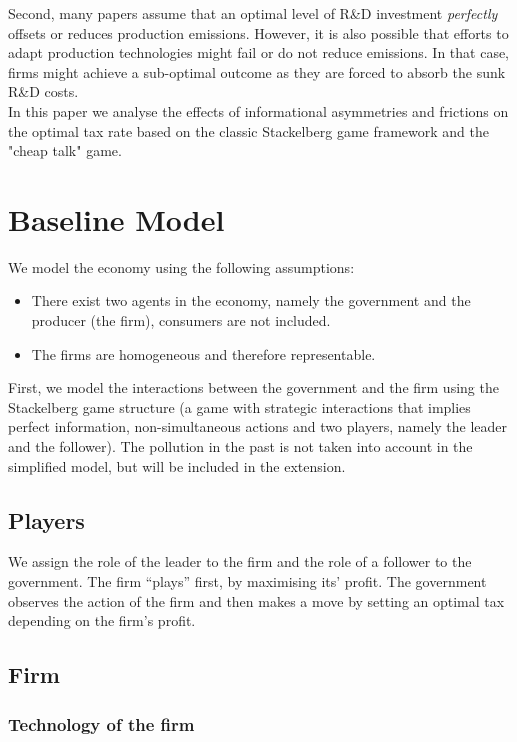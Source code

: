 \documentclass{article}
\begin{document}
Second, many papers assume that an optimal level of R\&D investment \textit{perfectly} offsets or reduces production emissions. However, it is also possible that efforts to adapt production technologies might fail or do not reduce emissions. In that case, firms might achieve a sub-optimal outcome as they are forced to absorb the sunk R\&D costs.\\

In this paper we analyse the effects of informational asymmetries and frictions on the optimal tax rate based on the classic Stackelberg game framework and the "cheap talk" game. \\ 
 
\section{Baseline Model}
We model the economy using the following assumptions: 

\begin{itemize}
    \item There exist two agents in the economy, namely the government and the producer (the firm), consumers are not included.
    \item The firms are homogeneous and therefore representable. 
\end{itemize} 

First, we model the interactions between the government and the firm using the Stackelberg game structure (a game with strategic interactions that implies perfect information, non-simultaneous actions and two players, namely the leader and the follower). The pollution in the past is not taken into account in the simplified model, but will be included in the extension. 

\subsection{Players}
We assign the role of the leader to the firm and the role of a follower to the government. The firm  “plays” first, by maximising its' profit. The government observes the action of the firm and then makes a move by setting an optimal tax depending on the firm's profit. \\

\subsection{Firm}

\subsubsection{Technology of the firm}
\end{document}
